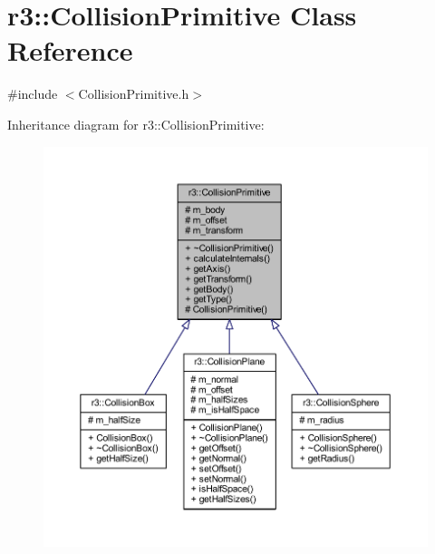 \hypertarget{classr3_1_1_collision_primitive}{}\section{r3\+:\+:Collision\+Primitive Class Reference}
\label{classr3_1_1_collision_primitive}


{\ttfamily \#include $<$Collision\+Primitive.\+h$>$}



Inheritance diagram for r3\+:\+:Collision\+Primitive\+:\nopagebreak
\begin{figure}[H]
\begin{center}
\leavevmode
\includegraphics[width=350pt]{classr3_1_1_collision_primitive__inherit__graph}
\end{center}
\end{figure}



